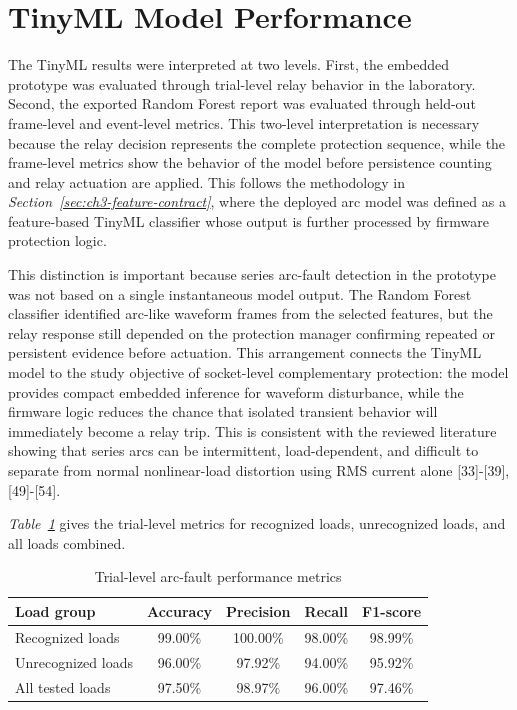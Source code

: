 \section{TinyML Model Performance}
\label{sec:ch4-tinyml-model-performance}

The TinyML results were interpreted at two levels. First, the embedded
prototype was evaluated through trial-level relay behavior in the laboratory.
Second, the exported Random Forest report was evaluated through held-out
frame-level and event-level metrics. This two-level interpretation is necessary
because the relay decision represents the complete protection sequence, while
the frame-level metrics show the behavior of the model before persistence
counting and relay actuation are applied. This follows the methodology in
\textit{Section~\ref{sec:ch3-feature-contract}}, where the deployed arc model
was defined as a feature-based TinyML classifier whose output is further
processed by firmware protection logic.

This distinction is important because series arc-fault detection in the
prototype was not based on a single instantaneous model output. The Random
Forest classifier identified arc-like waveform frames from the selected
features, but the relay response still depended on the protection manager
confirming repeated or persistent evidence before actuation. This arrangement
connects the TinyML model to the study objective of socket-level complementary
protection: the model provides compact embedded inference for waveform
disturbance, while the firmware logic reduces the chance that isolated
transient behavior will immediately become a relay trip. This is consistent
with the reviewed literature showing that series arcs can be intermittent,
load-dependent, and difficult to separate from normal nonlinear-load
distortion using RMS current alone [33]-[39], [49]-[54].

\textit{Table~\ref{tab:ch4-trial-metrics}} gives the trial-level metrics for
recognized loads, unrecognized loads, and all loads combined.

\begin{table}[H]
  \centering
  \caption{Trial-level arc-fault performance metrics}
  \label{tab:ch4-trial-metrics}
  \begin{tabular}{lcccc}
    \toprule
    \textbf{Load group} & \textbf{Accuracy} & \textbf{Precision} & \textbf{Recall} & \textbf{F1-score} \\
    \midrule
    Recognized loads & 99.00\% & 100.00\% & 98.00\% & 98.99\% \\
    Unrecognized loads & 96.00\% & 97.92\% & 94.00\% & 95.92\% \\
    All tested loads & 97.50\% & 98.97\% & 96.00\% & 97.46\% \\
    \bottomrule
  \end{tabular}
\end{table}

